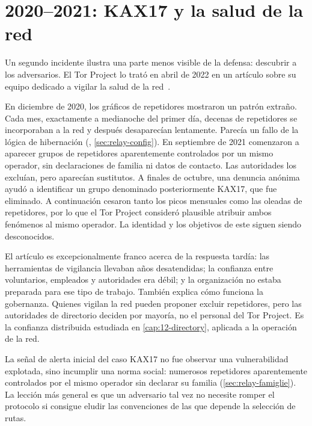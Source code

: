 \section{2020--2021: KAX17 y la salud de la red}\label{sec:casi-kax17}

Un segundo incidente ilustra una parte menos visible de la defensa: descubrir a los adversarios. El Tor Project lo trató en abril de 2022 en un artículo sobre su equipo dedicado a vigilar la salud de la red~\cite{torblog2022badrelays}.

En diciembre de 2020, los gráficos de repetidores mostraron un patrón extraño. Cada mes, exactamente a medianoche del primer día, decenas de repetidores se incorporaban a la red y después desaparecían lentamente. Parecía un fallo de la lógica de hibernación (, \cref{sec:relay-config}). En septiembre de 2021 comenzaron a aparecer grupos de repetidores aparentemente controlados por un mismo operador, sin declaraciones de familia ni datos de contacto. Las autoridades los excluían, pero aparecían sustitutos. A finales de octubre, una denuncia anónima ayudó a identificar un grupo denominado posteriormente KAX17, que fue eliminado. A continuación cesaron tanto los picos mensuales como las oleadas de repetidores, por lo que el Tor Project consideró plausible atribuir ambos fenómenos al mismo operador. La identidad y los objetivos de este siguen siendo desconocidos.

El artículo es excepcionalmente franco acerca de la respuesta tardía: las herramientas de vigilancia llevaban años desatendidas; la confianza entre voluntarios, empleados y autoridades era débil; y la organización no estaba preparada para ese tipo de trabajo. También explica cómo funciona la gobernanza. Quienes vigilan la red pueden proponer excluir repetidores, pero las autoridades de directorio deciden por mayoría, no el personal del Tor Project. Es la confianza distribuida estudiada en \cref{cap:12-directory}, aplicada a la operación de la red.

\begin{approfondimento}
La señal de alerta inicial del caso KAX17 no fue observar una vulnerabilidad explotada, sino incumplir una norma social: numerosos repetidores aparentemente controlados por el mismo operador sin declarar su familia (\cref{sec:relay-famiglie}). La lección más general es que un adversario tal vez no necesite romper el protocolo si consigue eludir las convenciones de las que depende la selección de rutas.
\end{approfondimento}

